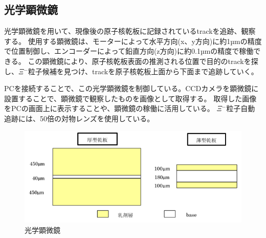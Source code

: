 \documentclass[12pt,a4paper]{jarticle}
\begin{document}
\subsection{光学顕微鏡}
光学顕微鏡を用いて、現像後の原子核乾板に記録されているtrackを追跡、観察する。
使用する顕微鏡は、モーターによって水平方向(x、y方向)に約1µmの精度で位置制御し、エンコーダーによって鉛直方向(z方向)に約0.1µmの精度で稼働できる。
この顕微鏡により、原子核乾板表面の推測される位置で目的のtrackを探し、$\Xi$$^-$粒子候補を見つけ、trackを原子核乾板上面から下面まで追跡していく。
\par
PCを接続することで、この光学顕微鏡を制御している。CCDカメラを顕微鏡に設置することで、顕微鏡で観察したものを画像として取得する。
取得した画像をPCの画面上に表示することや、顕微鏡の稼働に活用している。
$\Xi$$^-$粒子自動追跡には、50倍の対物レンズを使用している。
\begin{figure}[htbp]
    \begin{center}
     \includegraphics[width=140mm]{emulsionorder.png}
    \end{center}
    \caption{光学顕微鏡\label{fig:microscope}}
\end{figure}
\newpage
\end{document}
